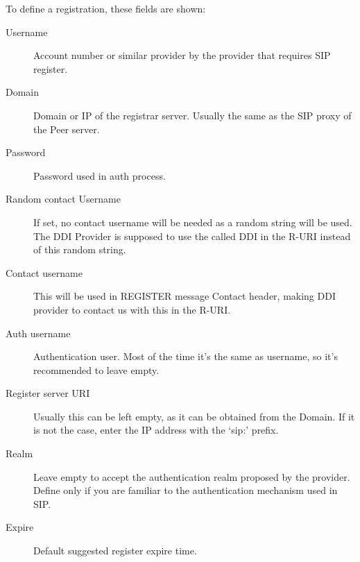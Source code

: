 \documentclass[letterpaper,10pt,english]{sphinxmanual}
\begin{document}
To define a registration, these fields are shown:
\begin{description}
\item[{Username}] \leavevmode{}\label{administration_portal/brand/providers/ddi_providers:term-username}
Account number or similar provider by the provider that requires SIP
register.

\item[{Domain}] \leavevmode{}\label{administration_portal/brand/providers/ddi_providers:term-domain}
Domain or IP of the registrar server. Usually the same as the SIP proxy
of the Peer server.

\item[{Password}] \leavevmode{}\label{administration_portal/brand/providers/ddi_providers:term-password}
Password used in auth process.

\item[{Random contact Username}] \leavevmode{}\label{administration_portal/brand/providers/ddi_providers:term-random-contact-username}
If set, no contact username will be needed as a random string will be used. The
DDI Provider is supposed to use the called DDI in the R-URI instead of this random string.

\item[{Contact username}] \leavevmode{}\label{administration_portal/brand/providers/ddi_providers:term-contact-username}
This will be used in REGISTER message Contact header, making DDI provider to
contact us with this in the R-URI.

\item[{Auth username}] \leavevmode{}\label{administration_portal/brand/providers/ddi_providers:term-auth-username}
Authentication user. Most of the time it's the same as username, so
it's recommended to leave empty.

\item[{Register server URI}] \leavevmode{}\label{administration_portal/brand/providers/ddi_providers:term-register-server-uri}
Usually this can be left empty, as it can be obtained from the
Domain. If it is not the case, enter the IP address with the `sip:'
prefix.

\item[{Realm}] \leavevmode{}\label{administration_portal/brand/providers/ddi_providers:term-realm}
Leave empty to accept the authentication realm proposed by the provider.
Define only if you are familiar to the authentication mechanism used
in SIP.

\item[{Expire}] \leavevmode{}\label{administration_portal/brand/providers/ddi_providers:term-expire}
Default suggested register expire time.

\end{description}
\end{document}
